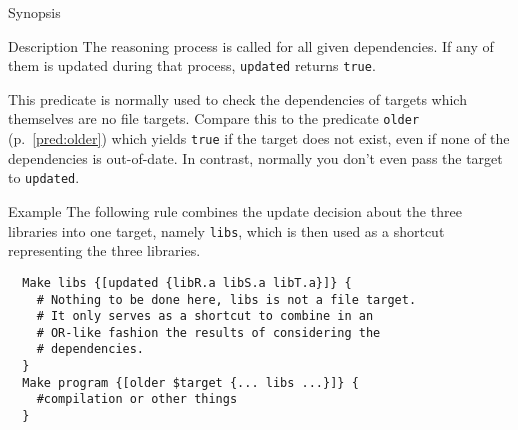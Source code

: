 \documentclass[11pt,bibtotoc,idxtotoc]{scrreprt}
\begin{document}
\label{pred:updated}
\begin{Describe}
\item[Synopsis]  
\item[Description] The reasoning process is called for all given
  dependencies. If any of them is updated during that process,
  \texttt{updated} returns \texttt{true}. 
  
  This predicate is normally used to check the dependencies of targets
  which themselves are no file targets. Compare this to the predicate
  \texttt{older} (p.~\ref{pred:older}) which yields \texttt{true} if
  the target does not exist, even if none of the dependencies is
  out-of-date. In contrast, normally you don't even pass the target to
  \texttt{updated}.
  
\item[Example] The following rule combines the update decision about
  the three libraries into one target, namely \texttt{libs}, which is
  then used as a shortcut representing the three libraries.
\begin{verbatim}
  Make libs {[updated {libR.a libS.a libT.a}]} {
    # Nothing to be done here, libs is not a file target. 
    # It only serves as a shortcut to combine in an 
    # OR-like fashion the results of considering the 
    # dependencies.
  }
  Make program {[older $target {... libs ...}]} {
    #compilation or other things
  }
\end{verbatim}

\end{Describe}

\end{document}
